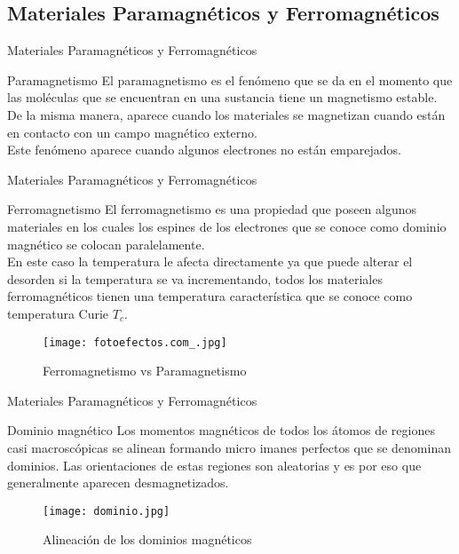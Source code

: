 \documentclass[10pt]{beamer}
\begin{document}
    \subsection{\textrm{Materiales Paramagnéticos y Ferromagnéticos}}
        \begin{frame}{\textrm{Materiales Paramagnéticos y Ferromagnéticos}}
            \begin{block}{Paramagnetismo}
                El paramagnetismo es el fenómeno que se da en el momento que las moléculas que se encuentran en una sustancia tiene un magnetismo estable.\vspace{0.3cm}\\ De la misma manera, aparece cuando los materiales se magnetizan cuando están en contacto con un campo magnético externo. \vspace{0.3cm}\\Este fenómeno aparece cuando algunos electrones no están emparejados.
            \end{block}
        \end{frame}
        \begin{frame}{\textrm{Materiales Paramagnéticos y Ferromagnéticos}}
            \begin{block}{Ferromagnetismo}
                El ferromagnetismo es una propiedad que poseen algunos materiales en los cuales los espines de los electrones que se conoce como dominio magnético se colocan paralelamente.\vspace{0.3cm}\\ En este caso la temperatura le afecta directamente ya que puede alterar el desorden si la temperatura se va incrementando, todos los materiales ferromagnéticos tienen una temperatura característica que se conoce como temperatura Curie $T_c$.
            \end{block}
            \begin{figure}
                \centering
                \texttt{[image: fotoefectos.com\_.jpg]}
                \caption{Ferromagnetismo vs Paramagnetismo}
                \label{fig:dominio2}
            \end{figure}
        \end{frame}
        \begin{frame}{\textrm{Materiales Paramagnéticos y Ferromagnéticos}}
            \begin{block}{Dominio magnético}
            Los momentos magnéticos de todos los átomos de regiones casi macroscópicas se alinean formando micro imanes perfectos que se denominan dominios. Las orientaciones  de estas regiones son aleatorias y es por eso que generalmente aparecen desmagnetizados.
            \end{block}
            \begin{figure}
                \centering
                \texttt{[image: dominio.jpg]}
                \caption{Alineación de los dominios magnéticos}
                \label{fig:dominio1}
            \end{figure}
        \end{frame}
\end{document}
